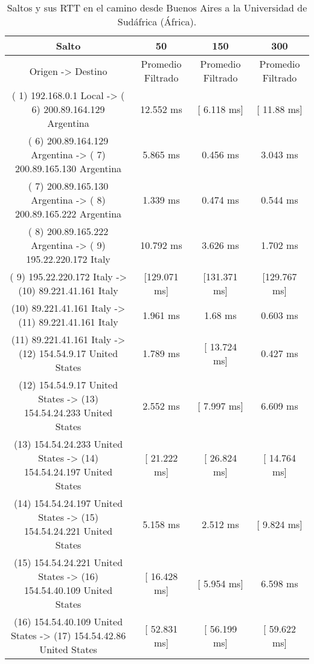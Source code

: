 \begin{table}[]
\centering
\caption{Saltos y sus RTT en el camino desde Buenos Aires a la Universidad de Sudáfrica (África).}
\begin{tabular}{ | c | c | c | c | }
	\hline 
Salto	& 50	& 150	& 300 \\ \hline
               Origen                ->               Destino              & 	Promedio Filtrado&	Promedio Filtrado&	Promedio Filtrado\\ \hline
( 1) 192.168.0.1     Local           -> ( 6) 200.89.164.129  Argentina     & 	    12.552 ms   	&  [  6.118 ms]  	 & [  11.88 ms]  \\ \hline
( 6) 200.89.164.129  Argentina       -> ( 7) 200.89.165.130  Argentina     & 	     5.865 ms   	&     0.456 ms   	 &    3.043 ms   \\ \hline
( 7) 200.89.165.130  Argentina       -> ( 8) 200.89.165.222  Argentina     & 	     1.339 ms   	&     0.474 ms   	 &    0.544 ms   \\ \hline
( 8) 200.89.165.222  Argentina       -> ( 9) 195.22.220.172  Italy         & 	    10.792 ms   	&     3.626 ms   	 &    1.702 ms   \\ \hline
( 9) 195.22.220.172  Italy           -> (10) 89.221.41.161   Italy         & 	  [129.071 ms]  	&  [131.371 ms]  	 & [129.767 ms]  \\ \hline
(10) 89.221.41.161   Italy           -> (11) 89.221.41.161   Italy         & 	     1.961 ms   	&      1.68 ms   	 &    0.603 ms   \\ \hline
(11) 89.221.41.161   Italy           -> (12) 154.54.9.17     United States & 	     1.789 ms   	&  [ 13.724 ms]  	 &    0.427 ms   \\ \hline
(12) 154.54.9.17     United States   -> (13) 154.54.24.233   United States & 	     2.552 ms   	&  [  7.997 ms]  	 &    6.609 ms   \\ \hline
(13) 154.54.24.233   United States   -> (14) 154.54.24.197   United States & 	  [ 21.222 ms]  	&  [ 26.824 ms]  	 & [ 14.764 ms]  \\ \hline
(14) 154.54.24.197   United States   -> (15) 154.54.24.221   United States & 	     5.158 ms   	&     2.512 ms   	 & [  9.824 ms]  \\ \hline
(15) 154.54.24.221   United States   -> (16) 154.54.40.109   United States & 	  [ 16.428 ms]  	&  [  5.954 ms]  	 &    6.598 ms   \\ \hline
(16) 154.54.40.109   United States   -> (17) 154.54.42.86    United States & 	  [ 52.831 ms]  	&  [ 56.199 ms]  	 & [ 59.622 ms]  \\ \hline

\end{tabular}
\end{table}
